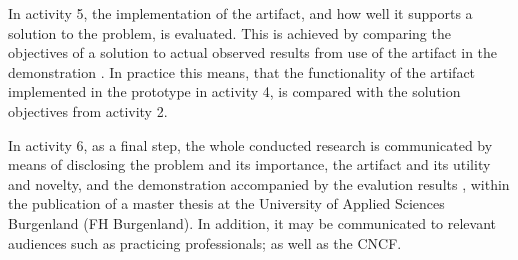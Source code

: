 \noindent
In activity 5,
the implementation of the artifact,
and how well it supports a solution to the problem,
is evaluated.
This is achieved by
comparing the objectives of a solution to actual observed results
from use of the artifact in the demonstration
\autocite{designScienceResearchMethodologyForInformationSystemsResearch}.
In practice this means, that
the functionality of the artifact implemented in the prototype in activity 4,
is compared with the solution objectives from activity 2.
\bigskip

\noindent
In activity 6, as a final step,
the whole conducted research is communicated by means of
disclosing
the problem and its importance,
the artifact and its utility and novelty,
and the demonstration accompanied by the evalution results
\autocite{designScienceResearchMethodologyForInformationSystemsResearch},
within the publication of a master thesis at
the University of Applied Sciences Burgenland (FH Burgenland).
In addition, it may be communicated to relevant audiences such as practicing professionals;
as well as the CNCF.

\pagebreak




















